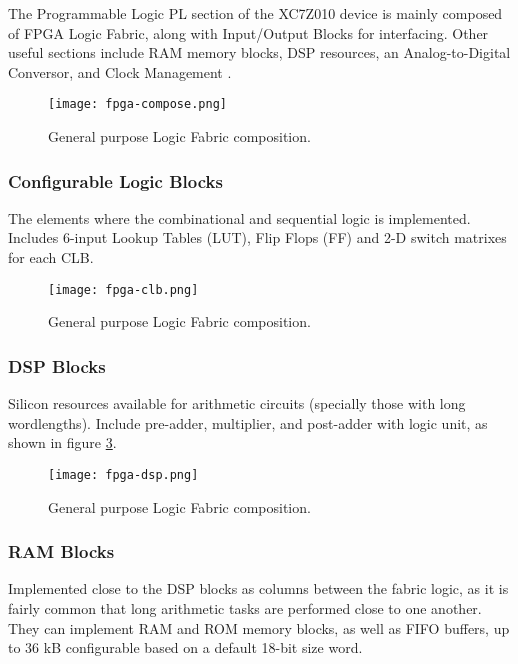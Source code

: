 The Programmable Logic PL section of the XC7Z010 device is mainly composed of FPGA Logic Fabric, along with Input/Output Blocks for interfacing. Other useful sections include RAM memory blocks, DSP resources, an Analog-to-Digital Conversor, and Clock Management \cite[p.~23]{Crokett2014}.

\begin{figure}[htp]
	\centering
	\texttt{[image: fpga-compose.png]}
	\caption{General purpose Logic Fabric composition.} \label{fig:fpga-compose}
\end{figure}

\subsubsection{Configurable Logic Blocks}

The elements where the combinational and sequential logic is implemented. Includes 6-input Lookup Tables (LUT), Flip Flops (FF) and 2-D switch matrixes for each CLB.

\begin{figure}[htp]
	\centering
	\texttt{[image: fpga-clb.png]}
	\caption{General purpose Logic Fabric composition.} \label{fig:fpga-clb}
\end{figure}

\subsubsection{DSP Blocks}

Silicon resources available for arithmetic circuits (specially those with long wordlengths). Include pre-adder, multiplier, and post-adder with logic unit, as shown in figure \ref{fig:fpga-dsp}.

\begin{figure}[htp]
	\centering
	\texttt{[image: fpga-dsp.png]}
	\caption{General purpose Logic Fabric composition.} \label{fig:fpga-dsp}
\end{figure}

\subsubsection{RAM Blocks}

Implemented close to the DSP blocks as columns between the fabric logic, as it is fairly common that long arithmetic tasks are performed close to one another. They can implement RAM and ROM memory blocks, as well as FIFO buffers, up to 36 kB configurable based on a default 18-bit size word.

